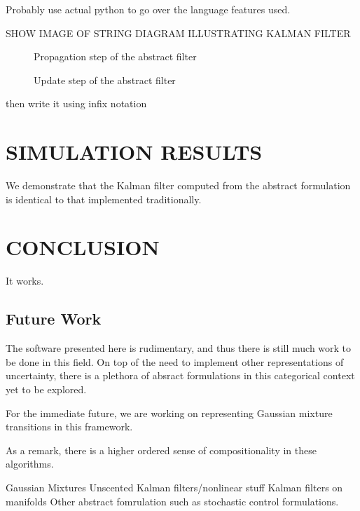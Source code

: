 \documentclass[letterpaper, 10 pt, conference]{ieeeconf}  %
\begin{document}
Probably use actual python to go over the language features used.

SHOW IMAGE OF STRING DIAGRAM ILLUSTRATING KALMAN FILTER

\begin{figure}[thpb]
    \framebox{\parbox{3in}{\centering}}
    \label{propagate-string}
    \caption{Propagation step of the abstract filter}
\end{figure}

\begin{figure}[thpb]
    \framebox{\parbox{3in}{\centering}}
    \label{update-string}
    \caption{Update step of the abstract filter}
\end{figure}

then write it using infix notation

\section{SIMULATION RESULTS}

We demonstrate that the Kalman filter computed from the abstract formulation is identical to that implemented traditionally. 



\section{CONCLUSION}
It works.

\subsection{Future Work}

The software presented here is rudimentary, and thus there is still much work to be done in this field.
On top of the need to implement other representations of uncertainty, there is a plethora of absract formulations in this categorical context yet to be explored.

For the immediate future, we are working on representing Gaussian mixture transitions in this framework.

As a remark, there is a higher ordered sense of compositionality in these algorithms.

Gaussian Mixtures
Unscented Kalman filters/nonlinear stuff
Kalman filters on manifolds
Other abstract fomrulation such as stochastic control formulations.
\end{document}
